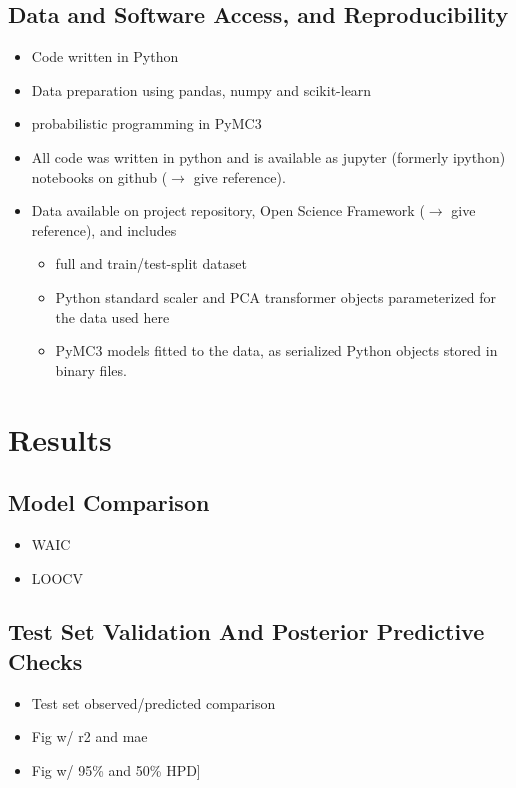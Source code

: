 \documentclass[10pt,a4paper]{article}
\begin{document}
		\subsection{Data and Software Access, and Reproducibility}
		    \begin{itemize}
		        \item Code written in Python
		        \item Data preparation using pandas, numpy and scikit-learn
		        \item probabilistic programming in PyMC3
	            \item All code was written in python and is available as jupyter (formerly ipython) notebooks on github ($\rightarrow$ give reference). 
	            \item Data available on project repository, Open Science Framework ($\rightarrow$ give reference), and includes
	            \begin{itemize}
	                \item full and train/test-split dataset
	                \item Python standard scaler and PCA transformer objects parameterized for the data used here
	                \item PyMC3 models fitted to the data, as serialized Python objects stored in binary files.
    	        \end{itemize}
	       \end{itemize}
	\newpage
	\section{Results}
		\subsection{Model Comparison}
			\begin{itemize}
				\item WAIC
				\item LOOCV
			\end{itemize}
		\subsection{Test Set Validation And Posterior Predictive Checks}
			\begin{itemize}
				\item Test set observed/predicted comparison 
				\item Fig w/ r2 and mae
				\item Fig w/ 95\% and 50\% HPD]
			\end{itemize}
\end{document}
